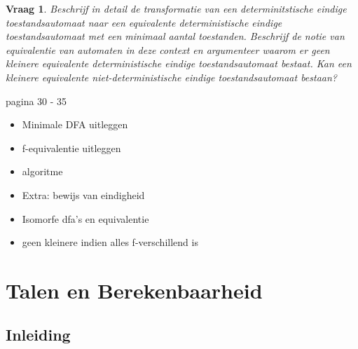 \documentclass[10pt,a4paper]{article}
\newtheorem{qtext}{Vraag}
\newenvironment{question}{\newpage\begin{qbox}\begin{qtext}}{\end{qtext}\end{qbox}}
\begin{document}
\begin{question}
	Beschrijf in detail de transformatie van een determinitstische eindige toestandsautomaat naar een equivalente deterministische eindige toestandsautomaat met een minimaal aantal toestanden. Beschrijf de notie van equivalentie van automaten in deze context en argumenteer waarom er geen kleinere equivalente deterministische eindige toestandsautomaat bestaat. Kan een kleinere equivalente niet-deterministische eindige toestandsautomaat bestaan?
\end{question}

pagina 30 - 35
\begin{itemize}
	\item Minimale DFA uitleggen
	\item f-equivalentie uitleggen
	\item algoritme
	\item Extra: bewijs van eindigheid
	\item Isomorfe dfa's en equivalentie
	\item geen kleinere indien alles f-verschillend is
\end{itemize}

\newpage





\newpage


\section{Talen en Berekenbaarheid}

\subsection{Inleiding}
\end{document}
